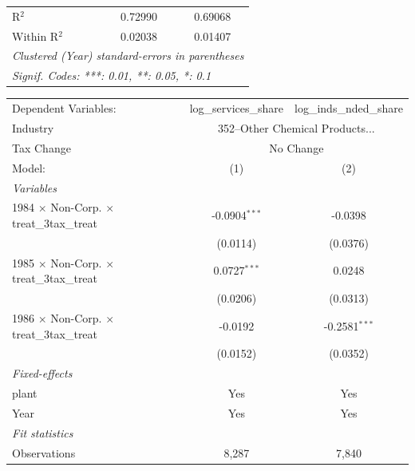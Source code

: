 \documentclass[
  12pt]{article}
\theoremstyle{definition}
\theoremstyle{remark}
\begin{document}
\begin{table}
\begin{minipage}{\linewidth}
\begin{tabular}{lcc}
   R$^2$                                                   & 0.72990                & 0.69068\\  
   Within R$^2$                                            & 0.02038                & 0.01407\\  
   \midrule \midrule
   \multicolumn{3}{l}{\emph{Clustered (Year) standard-errors in parentheses}}\\
   \multicolumn{3}{l}{\emph{Signif. Codes: ***: 0.01, **: 0.05, *: 0.1}}\\
\end{tabular}
\par\endgroup
\begingroup
\centering
\begin{tabular}{lcc}
   \tabularnewline \midrule \midrule
   Dependent Variables:                                    & log\_services\_share   & log\_inds\_nded\_share\\     
   Industry & \multicolumn{2}{c}{352–Other Chemical Products...} \\ 
   Tax Change & \multicolumn{2}{c}{No Change} \\ 
   Model:                                                  & (1)                    & (2)\\  
   \midrule
   \emph{Variables}\\
   1984 $\times$ Non-Corp. $\times$ treat\_3tax\_treat     & -0.0904$^{***}$        & -0.0398\\   
                                                           & (0.0114)               & (0.0376)\\   
   1985 $\times$ Non-Corp. $\times$ treat\_3tax\_treat     & 0.0727$^{***}$         & 0.0248\\   
                                                           & (0.0206)               & (0.0313)\\   
   1986 $\times$ Non-Corp. $\times$ treat\_3tax\_treat     & -0.0192                & -0.2581$^{***}$\\   
                                                           & (0.0152)               & (0.0352)\\   
   \midrule
   \emph{Fixed-effects}\\
   plant                                                   & Yes                    & Yes\\  
   Year                                                    & Yes                    & Yes\\  
   \midrule
   \emph{Fit statistics}\\
   Observations                                            & 8,287                  & 7,840\\  

\end{tabular}
\end{minipage}
\end{table}
\end{document}
